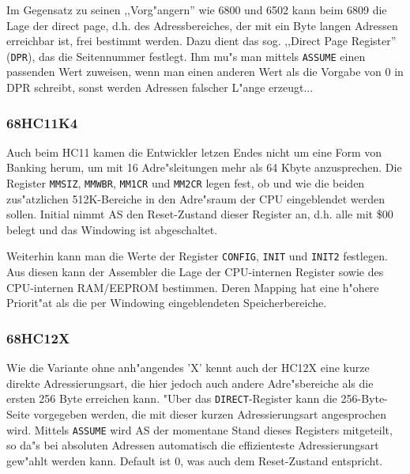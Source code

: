 \documentclass[12pt,a4paper,twoside]{report}
\newcommand{\tty}[1]{{\tt #1}}
\begin{document}
Im Gegensatz zu seinen ,,Vorg"angern'' wie 6800 und 6502 kann beim
6809 die Lage der direct page, d.h. des Adressbereiches, der mit ein
Byte langen Adressen erreichbar ist, frei bestimmt werden.  Dazu dient
das sog. ,,Direct Page Register'' (\tty{DPR}), das die Seitennummer
festlegt.  Ihm mu"s man mittels \tty{ASSUME} einen passenden Wert
zuweisen, wenn man einen anderen Wert als die Vorgabe von 0 in DPR
schreibt, sonst werden Adressen falscher L"ange erzeugt...



\subsubsection{68HC11K4}

Auch beim HC11 kamen die Entwickler letzen Endes nicht um eine Form von
Banking herum, um mit 16 Adre"sleitungen mehr als 64 Kbyte anzusprechen.  Die
Register {\tt MMSIZ}, {\tt MMWBR}, {\tt MM1CR} und {\tt MM2CR} legen fest,
ob und wie die beiden zus"atzlichen 512K-Bereiche in den Adre"sraum der CPU
eingeblendet werden sollen.  Initial nimmt AS den Reset-Zustand
dieser Register an, d.h. alle mit \$00 belegt und das Windowing ist
abgeschaltet.

Weiterhin kann man die Werte der Register {\tt CONFIG}, {\tt INIT} und {\tt INIT2}
festlegen.  Aus diesen kann der Assembler die Lage der CPU-internen Register sowie
des CPU-internen RAM/EEPROM bestimmen.  Deren Mapping hat eine h"ohere Priorit"at
als die per Windowing eingeblendeten Speicherbereiche.


\subsubsection{68HC12X}

Wie die Variante ohne anh"angendes 'X' kennt auch der HC12X eine kurze
direkte Adressierungsart, die hier jedoch auch andere Adre"sbereiche als
die ersten 256 Byte erreichen kann.  "Uber das {\tt DIRECT}-Register kann
die 256-Byte-Seite vorgegeben werden, die mit dieser kurzen
Adressierungsart angesprochen wird.  Mittels {\tt ASSUME} wird AS der
momentane Stand dieses Registers mitgeteilt, so da"s bei absoluten
Adressen automatisch die effizienteste Adressierungsart gew"ahlt werden
kann.  Default ist 0, was auch dem Reset-Zustand entspricht.
\end{document}
